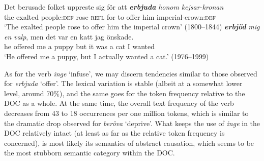 \documentclass[output=paper]{langscibook}
\begin{document}
\ea \label{ex:valdeson:22}
 \gll Det   berusade   folket       uppreste   sig     för   att \textbf{\textit{erbjuda}} \textit{honom} \textit{kejsar-kronan} \\
    the     exalted     people\textsc{:def}   rose       \textsc{refl} for   to offer               him    imperial-crown:\textsc{def}\\
\glt    ‘The exalted people rose to offer him the imperial crown’ (1800–1844)
\ex \label{ex:valdeson:23}
 \textbf{\textit{erbjöd}} \textit{mig} \textit{en} \textit{valp}, {men} {det} {var} {en} {katt} {jag} {önskade}.\\
  he     offered   me     a   puppy   but       it     was   a   cat   I     wanted\\
\glt `He offered me a puppy, but I actually wanted a cat.’ (1976–1999)
\z


\label{sec:valdeson:5.3.3.3}



As for the verb \textit{inge} ‘infuse’, we may discern tendencies similar to those observed for \textit{erbjuda} ‘offer’. The lexical variation is stable (albeit at a somewhat lower level, around 70\%), and the same goes for the token frequency relative to the DOC as a whole. At the same time, the overall text frequency of the verb decreases from 43 to 18 occurrences per one million tokens, which is similar to the dramatic drop observed for \textit{beröva} ‘deprive’. What keeps the use of \textit{inge} in the DOC relatively intact (at least as far as the relative token frequency is concerned), is most likely its semantics of abstract causation, which seems to be the most stubborn semantic category within the DOC.


\begin{table}
\caption{Frequency measures of the verb-specific DOC with \textit{inge} ‘infuse’}
\label{tab:valdeson:16}
\end{table}
\end{document}

